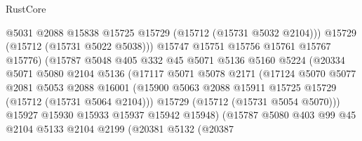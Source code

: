 \begin{lexlean}{RustCore}
\begin{coremodule}
                                @5031
                                @2088
                                @15838
                                @15725
                                @15729
                                (@15712 (@15731 @5032 @2104)))
                              @15729
                              (@15712 (@15731 @5022 @5038)))
                            @15747
                            @15751
                            @15756
                            @15761
                            @15767
                            @15776)
                          (@15787
                            @5048
                            @405
                            @332
                            @45
                            @5071
                            @5136
                            @5160
                            @5224
                            (@20334
                              @5071
                              @5080
                              @2104
                              @5136
                              (@17117
                                @5071
                                @5078
                                @2171
                                (@17124
                                  @5070
                                  @5077
                                  @2081
                                  @5053
                                  @2088
                                  @16001
                                  (@15900
                                    @5063
                                    @2088
                                    @15911
                                    @15725
                                    @15729
                                    (@15712 (@15731 @5064 @2104)))
                                  @15729
                                  (@15712 (@15731 @5054 @5070)))
                                @15927
                                @15930
                                @15933
                                @15937
                                @15942
                                @15948)
                              (@15787
                                @5080
                                @403
                                @99
                                @45
                                @2104
                                @5133
                                @2104
                                @2199
                                (@20381
                                  @5132
                                  (@20387

\end{coremodule}
\end{lexlean}
